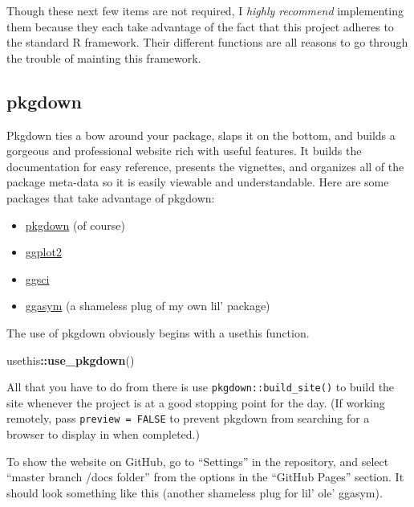 \documentclass[]{book}
\newenvironment{Shaded}{\begin{snugshade}}{\end{snugshade}}
\newcommand{\KeywordTok}[1]{\textcolor[rgb]{0.13,0.29,0.53}{\textbf{#1}}}
\newcommand{\NormalTok}[1]{#1}
\newcommand{\OperatorTok}[1]{\textcolor[rgb]{0.81,0.36,0.00}{\textbf{#1}}}
\providecommand{\tightlist}{%
  \setlength{\itemsep}{0pt}\setlength{\parskip}{0pt}}
\begin{document}
Though these next few items are not required, I \emph{highly recommend} implementing them because they each take advantage of the fact that this project adheres to the standard R framework. Their different functions are all reasons to go through the trouble of mainting this framework.

\hypertarget{pkgdown}{%
\subsection{pkgdown}\label{pkgdown}}

Pkgdown ties a bow around your package, slaps it on the bottom, and builds a gorgeous and professional website rich with useful features. It builds the documentation for easy reference, presents the vignettes, and organizes all of the package meta-data so it is easily viewable and understandable. Here are some packages that take advantage of pkgdown:

\begin{itemize}
\tightlist
\item
  \href{https://pkgdown.r-lib.org}{pkgdown} (of course)
\item
  \href{https://ggplot2.tidyverse.org}{ggplot2}
\item
  \href{https://nanx.me/ggsci/}{ggsci}
\item
  \href{https://jhrcook.github.io/ggasym/index.html}{ggasym} (a shameless plug of my own lil' package)
\end{itemize}

The use of pkgdown obviously begins with a usethis function.

\begin{Shaded}
\begin{Highlighting}[]
\NormalTok{usethis}\OperatorTok{::}\KeywordTok{use_pkgdown}\NormalTok{()}
\end{Highlighting}
\end{Shaded}

All that you have to do from there is use \texttt{pkgdown::build\_site()} to build the site whenever the project is at a good stopping point for the day. (If working remotely, pass \texttt{preview\ =\ FALSE} to prevent pkgdown from searching for a browser to display in when completed.)

To show the website on GitHub, go to ``Settings'' in the repository, and select ``master branch /docs folder'' from the options in the ``GitHub Pages'' section. It should look something like this (another shameless plug for lil' ole' ggasym).
\end{document}

